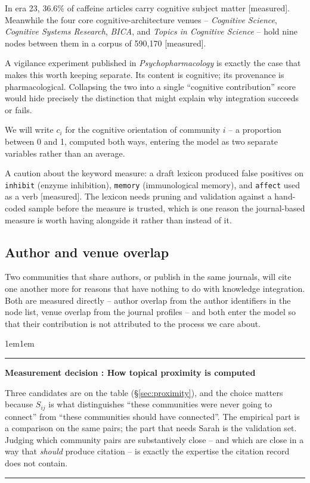 \documentclass[11pt]{article}
\newcommand{\meas}{{\footnotesize\textsf{[measured]}}}
\newcounter{measurecnt}
\newenvironment{measure}[1]{%
  \refstepcounter{measurecnt}%
  \par\vspace{0.8em}\noindent
  \begin{adjustwidth}{1em}{1em}%
  \rule{\linewidth}{0.4pt}\par\vspace{0.3em}
  \noindent\textbf{Measurement decision \themeasurecnt: #1}\par\vspace{0.2em}\small
}{%
  \par\vspace{0.3em}\noindent\rule{\linewidth}{0.4pt}%
  \end{adjustwidth}\vspace{0.8em}
}
\newcommand{\code}[1]{\texttt{\small #1}}
\begin{document}
In era 23, 36.6\% of caffeine articles carry cognitive subject matter \meas{}. Meanwhile
the four core cognitive-architecture venues -- \emph{Cognitive Science}, \emph{Cognitive
Systems Research}, \emph{BICA}, and \emph{Topics in Cognitive Science} -- hold nine nodes
between them in a corpus of 590{,}170 \meas{}.

A vigilance experiment published in \emph{Psychopharmacology} is exactly the case that
makes this worth keeping separate. Its content is cognitive; its provenance is
pharmacological. Collapsing the two into a single ``cognitive contribution'' score would
hide precisely the distinction that might explain why integration succeeds or fails.

We will write $c_i$ for the cognitive orientation of community $i$ -- a proportion between
0 and 1, computed both ways, entering the model as two separate variables rather than an
average.

A caution about the keyword measure: a draft lexicon produced false positives on
\code{inhibit} (enzyme inhibition), \code{memory} (immunological memory), and \code{affect}
used as a verb \meas{}. The lexicon needs pruning and validation against a hand-coded
sample before the measure is trusted, which is one reason the journal-based measure is
worth having alongside it rather than instead of it.

\subsection{Author and venue overlap}

Two communities that share authors, or publish in the same journals, will cite one another
more for reasons that have nothing to do with knowledge integration. Both are measured
directly -- author overlap from the author identifiers in the node list, venue overlap from
the journal profiles -- and both enter the model so that their contribution is not
attributed to the process we care about.

\begin{measure}{How topical proximity is computed}
Three candidates are on the table (\S\ref{sec:proximity}), and the choice matters because
$S_{ij}$ is what distinguishes ``these communities were never going to connect'' from
``these communities should have connected''. The empirical part is a comparison on the same
pairs; the part that needs Sarah is the validation set. Judging which community pairs are
substantively close -- and which are close in a way that \emph{should} produce citation --
is exactly the expertise the citation record does not contain.
\end{measure}
\end{document}
